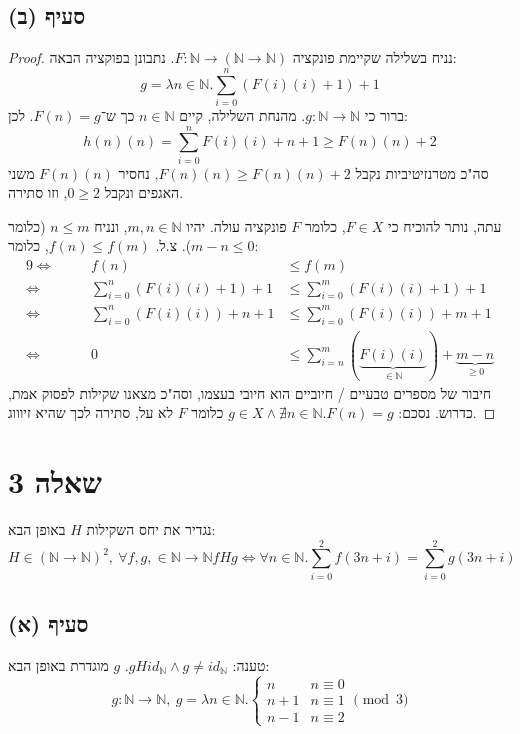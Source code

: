 \documentclass[]{article}
\newcommand\N     {\mathbb{N}}
\begin{document}
	\subsection*{סעיף (ב)}
	\begin{proof}
		
		נניח בשלילה שקיימת פונקציה $ F \colon \N \to (\N \to \N) $. נתבונן בפוקציה הבאה: 
		\[  g = \lambda n \in \N. \sum_{i = 0}^{n}(F(i)(i) + 1) + 1 \]
		ברור כי $ g \colon \N \to \N $. מהנחת השלילה, קיים $ n \in \N $ כך ש־$ F(n) = g $. לכן: 
		\[ h(n)(n) = \sum_{i = 0}^{n}F(i)(i) + n + 1 \ge F(n)(n) + 2 \]
		סה"כ מטרנזיטיביות נקבל $ F(n)(n) \ge F(n)(n) + 2 $, נחסיר $ F(n)(n) $ משני האגפים ונקבל $ 0 \ge 2 $, וזו סתירה. 
		
		עתה, נותר להוכיח כי $ F \in X $, כלומר $ F $ פונקציה עולה. יהיו $ m, n \in \N $, ונניח $ n \le m $ (כלומר $ m - n \le 0 $). צ.ל. $ f(n) \le f(m) $, כלומר: 
		\begin{alignat}{9}
			\iff \quad &&f(n) &\le f(m) \\
			\iff \quad &&\sum_{i = 0}^{n} (F(i)(i) + 1) + 1 &\le \sum_{i = 0}^{m} (F(i)(i) + 1) + 1 \\
			\iff \quad &&\sum_{i = 0}^{n} (F(i)(i)) + n + 1 &\le \sum_{i = 0}^{m} (F(i)(i)) + m + 1 \\
			\iff \quad &&0 &\le \sum_{i = n}^{m} (\underbrace{F(i)(i)}_{\in \N}) + \underbrace{m - n}_{\ge 0}
		\end{alignat}
		חיבור של מספרים טבעיים / חיוביים הוא חיובי בעצמו, וסה"כ מצאנו שקילות לפסוק אמת, כדרוש.
		נסכם: $ g \in X \land \nexists n \in \N. F(n) = g $ כלומר $ F $ לא על, סתירה לכך שהיא זיוווג. 
	\end{proof}
	\section*{שאלה 3}
	נגדיר את יחס השקילות $ H $ באופן הבא: 
	\[ H \in (\N \to \N)^2, \ \forall f, g, \in \N \to \N fHg \iff \forall n \in \N. \sum_{i = 0}^2 f(3n + i) = \sum_{i = 0}^{2} g(3n + i) \]
	\subsection*{סעיף (א)}
	טענה: $ gHid_\N \land g \neq id_\N $. $ g $ מוגדרת באופן הבא: 
	\[ g \colon \N \to \N, \ g = \lambda n \in \N. \begin{cases}
		n &n \equiv 0 \\
		n + 1 &n \equiv 1 \\
		n - 1 &n \equiv 2
	\end{cases} \pmod 3 \]
\end{document}
